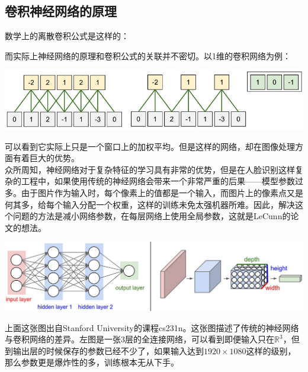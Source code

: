 \documentclass[12pt]{article}
\begin{document}
\subsection{卷积神经网络的原理}

数学上的离散卷积公式是这样的：\\

\noindent
{}

\bigskip

而实际上神经网络的原理和卷积公式的关联并不密切。以1维的卷积网络为例：\\

\begin{center}
\includegraphics[width=0.8\linewidth]{fig09.jpg}
\end{center}

可以看到它实际上只是一个窗口上的加权平均。但是这样的网络，却在图像处理方面有着巨大的优势。\\

众所周知，神经网络对于复杂特征的学习具有非常的优势，但是在人脸识别这样复杂的工程中，如果使用传统的神经网络会带来一个非常严重的后果——模型参数过多。由于图片作为输入时，每个像素上的值都是一个输入，而图片上的像素点又是何其多，给每个输入分配一个权重，这样的训练未免太强机器所难。因此，解决这个问题的方法是减小网络参数，在每层网络上使用全局参数，这就是LeCunn的论文的想法。\\

\begin{center}
\includegraphics[width=0.8\linewidth]{fig10.jpg}
\end{center}

上面这张图出自Stanford University的课程cs231n。这张图描述了传统的神经网络与卷积网络的差异。左图是一张3层的全连接网络，可以看到即便输入只在$\mathbb{R}^3$，但到输出层的时候保存的参数已经不少了，如果输入达到$1920 \times 1080$这样的级别，那么参数更是爆炸性的多，训练根本无从下手。\\
\end{document}
